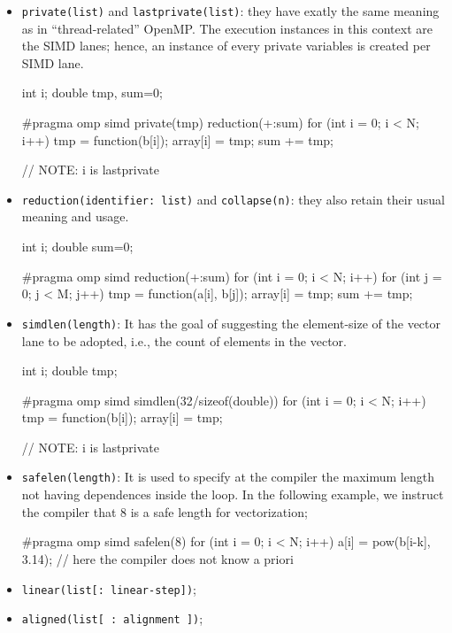 \begin{itemize}
    \item \texttt{private(list)} and \texttt{lastprivate(list)}: they have exatly the same meaning as in “thread-related” OpenMP.
    The execution instances in this context are the SIMD lanes; hence, an instance of every private variables is created per SIMD lane.
    \begin{codeblock}[language=C]
int i;
double tmp, sum=0;

#pragma omp simd private(tmp) reduction(+:sum)
for (int i = 0; i < N; i++) {
    tmp = function(b[i]);
    array[i] = tmp;
    sum += tmp;
}

// NOTE: i is lastprivate 
    \end{codeblock}
    \item \texttt{reduction(identifier: list)} and \texttt{collapse(n)}: they also retain their usual meaning and usage.
    \begin{codeblock}[language=C]
int i; 
double sum=0;

#pragma omp simd reduction(+:sum)
for (int i = 0; i < N; i++) {
    for (int j = 0; j < M; j++) {
        tmp = function(a[i], b[j]);
        array[i] = tmp;
        sum += tmp;
    }
}
    \end{codeblock}
    \item \texttt{simdlen(length)}: It has the goal of suggesting the element-size of the vector lane to be adopted, i.e., the count of elements in the vector. 
    \begin{codeblock}[language=C]
int i; 
double tmp;

#pragma omp simd simdlen(32/sizeof(double))
for (int i = 0; i < N; i++) {
    tmp = function(b[i]);
    array[i] = tmp;
}

// NOTE: i is lastprivate 
    \end{codeblock}
    \item \texttt{safelen(length)}: It is used to specify at the compiler the maximum length not having dependences inside the loop. In the following example, we instruct the compiler that 8 is a safe length for vectorization;
    \begin{codeblock}[language=C]
#pragma omp simd safelen(8)
for (int i = 0; i < N; i++) {
    a[i] = pow(b[i-k], 3.14); // here the compiler does not know a priori 
}
\end{codeblock}
    \item \texttt{linear(list[: linear-step])};
    \item \texttt{aligned(list[ : alignment ])};
\end{itemize}

